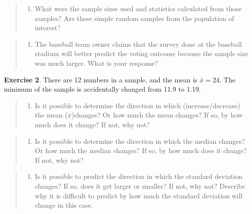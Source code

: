 \documentclass[
]{article}
\providecommand{\tightlist}{%
  \setlength{\itemsep}{0pt}\setlength{\parskip}{0pt}}
\begin{document}
\begin{quote}
\begin{enumerate}
\def\labelenumi{\alph{enumi}.}
\setcounter{enumi}{1}
\tightlist
\item
  What were the sample sizes used and statistics calculated from those
  samples? Are these simple random samples from the population of
  interest?
\end{enumerate}
\end{quote}

\begin{quote}
\begin{enumerate}
\def\labelenumi{\alph{enumi}.}
\setcounter{enumi}{2}
\tightlist
\item
  The baseball team owner claims that the survey done at the baseball
  stadium will better predict the voting outcome because the sample size
  was much larger. What is your response?
\end{enumerate}
\end{quote}

\vspace{1cm}

\textbf{Exercise 2}. There are 12 numbers in a sample, and the mean is
\(\bar{x}=24\). The minimum of the sample is accidentally changed from
11.9 to 1.19.

\begin{quote}
\begin{enumerate}
\def\labelenumi{\alph{enumi}.}
\tightlist
\item
  Is it possible to determine the direction in which (increase/decrease)
  the mean (\(\bar{x}\))changes? Or how much the mean changes? If so, by
  how much does it change? If not, why not?
\end{enumerate}
\end{quote}

\begin{quote}
\begin{enumerate}
\def\labelenumi{\alph{enumi}.}
\setcounter{enumi}{1}
\tightlist
\item
  Is it possible to determine the direction in which the median changes?
  Or how much the median changes? If so, by how much does it change? If
  not, why not?
\end{enumerate}
\end{quote}

\begin{quote}
\begin{enumerate}
\def\labelenumi{\alph{enumi}.}
\setcounter{enumi}{2}
\tightlist
\item
  Is it possible to predict the direction in which the standard
  deviation changes? If so, does it get larger or smaller? If not, why
  not? Describe why it is difficult to predict by how much the standard
  deviation will change in this case.
\end{enumerate}
\end{quote}
\end{document}
